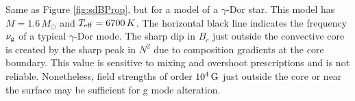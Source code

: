\label{fig:GdorProp}
Same as Figure \ref{fig:sdBProp}, but for a model of a $\gamma$-Dor star. This model has $M=1.6 \, M_\odot$ and $T_{\rm eff} = 6700 \, K$. The horizontal black line indicates the frequency $\nu_{\rm g}$ of a typical $\gamma$-Dor mode. The sharp dip in $B_c$ just outside the convective core is created by the sharp peak in $N^2$ due to composition gradients at the core boundary. This value is sensitive to mixing and overshoot prescriptions and is not reliable. Nonetheless, field strengths of order $10^4 \, {\rm G}$ just outside the core or near the surface may be sufficient for g mode alteration.